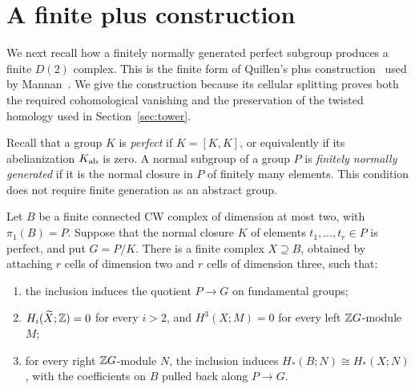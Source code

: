 \section{A finite plus construction}\label{sec:plus}

We next recall how a finitely normally generated perfect subgroup
produces a finite $D(2)$ complex. This is the finite form of Quillen's
plus construction~\cite{Quillen71} used by Mannan~\cite[Section~2]{Mannan09}.
We give the construction because its cellular splitting proves both
the required cohomological vanishing and the preservation of the twisted
homology used in Section~\ref{sec:tower}.

Recall that a group $K$ is \emph{perfect} if $K=[K,K]$, or equivalently
if its abelianization $K_{\mathrm{ab}}$ is zero. A normal subgroup of a group
$P$ is \emph{finitely normally generated} if it is the normal closure
in $P$ of finitely many elements. This condition does not require
finite generation as an abstract group.

\begin{proposition}\label{prop:plus}
Let $B$ be a finite connected CW complex of dimension at most two,
with $\pi_1(B)=P$. Suppose that the normal closure $K$ of elements
$t_1,\ldots,t_r\in P$ is perfect, and put $G=P/K$.
There is a finite complex $X\supseteq B$, obtained by attaching
$r$ cells of dimension two and $r$ cells of dimension three, such that:
\begin{enumerate}
\item the inclusion induces the quotient $P\to G$ on fundamental groups;
\item $H_i(\widetilde X;\mathbb Z)=0$ for every $i>2$, and
      $H^3(X;M)=0$ for every left $\mathbb Z G$-module $M$;
\item for every right $\mathbb Z G$-module $N$, the inclusion induces
      $H_*(B;N)\cong H_*(X;N)$, with the coefficients on $B$
      pulled back along $P\to G$.
\end{enumerate}
\end{proposition}

